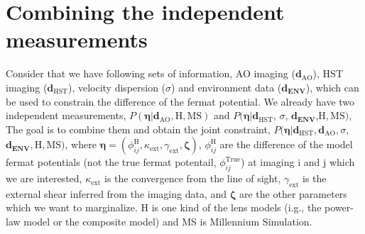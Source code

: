 \documentclass[useAMS,usenatbib]{mnras}
\begin{document}
\section{Combining the independent measurements}
\label{sec:bayesAOplusHST}
Consider that we have following sets of information, AO imaging ($\bm{d}_{\textrm{AO}}$), HST imaging ($\bm{d}_{\textrm{HST}}$), velocity dispersion ($\sigma$) and environment data ($\bm{d_{\textrm{ENV}}}$), which can be used to constrain the difference of the fermat potential. We already have two independent measurements, $P(\bm{\eta}|\bm{d}_{\textrm{AO}},\textrm{H},\textrm{MS})$ and $P(\bm{\eta}|\bm{d}_{\textrm{HST}}$, $\sigma$, $\bm{d_{\textrm{ENV}}}$,$\textrm{H},\textrm{MS})$, 
 The goal is to combine them and obtain the joint constraint, $P(\bm{\eta}|\bm{d}_{\textrm{HST}},\bm{d}_{\textrm{AO}},\sigma$, $\bm{d_{\textrm{ENV}}},\textrm{H},\textrm{MS})$, where $\bm{\eta}=(\phi_{ij}^{\textrm{H}},\kappa_{\textrm{ext}},\gamma_{\textrm{ext}},\bm{\zeta})$, $\phi_{ij}^{\textrm{H}}$ are the difference of the model fermat potentials (not the true fermat potentail,
$\phi_{ij}^{\textrm{True}}$) at imaging i and j which we are interested, $\kappa_{\textrm{ext}}$ is the convergence from the line of sight, $\gamma_{\textrm{ext}}$ is the external shear inferred from the imaging data, and $\bm{\zeta}$ are the other parameters which we want to marginalize. H is one kind of the lens models (i.g., the power-law model or the composite model) and MS is Millennium Simulation.
\end{document}

